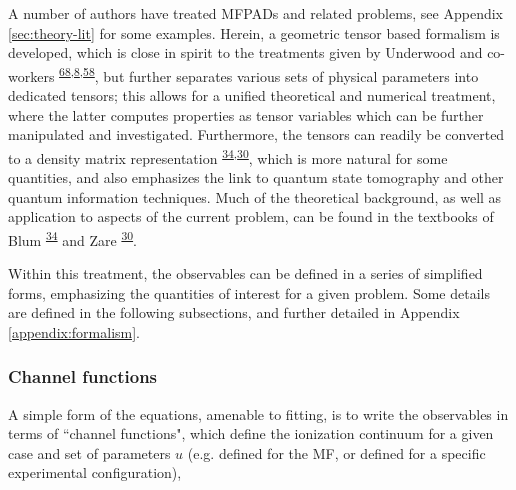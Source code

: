 \documentclass[10pt]{article}
\begin{document}
A number of authors have treated MFPADs and related problems, see Appendix \ref{sec:theory-lit} for some examples. Herein, a geometric tensor based formalism is developed, which is close in spirit to the treatments given by Underwood and co-workers \textsuperscript{\hyperref[csl:68]{68},\hyperref[csl:8]{8},\hyperref[csl:58]{58}}, but further separates various sets of physical parameters into dedicated tensors; this allows for a unified theoretical and numerical treatment, where the latter computes properties as tensor variables which can be further manipulated and investigated.%
Furthermore, the tensors can readily be converted to a density matrix representation \textsuperscript{\hyperref[csl:34]{34},\hyperref[csl:30]{30}}, which is more natural for some quantities, and also emphasizes the link to quantum state tomography and other quantum information techniques. Much of the theoretical background, as well as application to aspects of the current problem, can be found in the textbooks of Blum \textsuperscript{\hyperref[csl:34]{34}} and Zare \textsuperscript{\hyperref[csl:30]{30}}.

Within this treatment, the observables can be defined in a series of simplified forms, emphasizing the quantities of interest for a given problem. Some details are defined in the following subsections, and further detailed in Appendix \ref{appendix:formalism}.


\subsubsection{Channel functions\label{sec:channel-funcs}}

A simple form of the equations, amenable to fitting, is to write the observables in terms of ``channel functions", which define the ionization continuum for a given case and set of parameters $u$ (e.g. defined for the MF, or defined for a specific experimental configuration),
\end{document}
